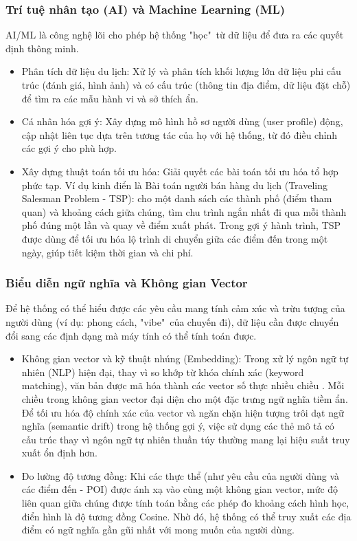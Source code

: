 \subsubsection{Trí tuệ nhân tạo (AI) và Machine Learning (ML)}
AI/ML là công nghệ lõi cho phép hệ thống "học"\ từ dữ liệu để đưa ra các quyết định thông minh.
\begin{itemize}
    \item Phân tích dữ liệu du lịch: Xử lý và phân tích khối lượng lớn dữ liệu phi cấu trúc (đánh giá, hình ảnh) và có cấu trúc (thông tin địa điểm, dữ liệu đặt chỗ) để tìm ra các mẫu hành vi và sở thích ẩn.
    \item Cá nhân hóa gợi ý: Xây dựng mô hình hồ sơ người dùng (user profile) động, cập nhật liên tục dựa trên tương tác của họ với hệ thống, từ đó điều chỉnh các gợi ý cho phù hợp.
    \item Xây dựng thuật toán tối ưu hóa: Giải quyết các bài toán tối ưu hóa tổ hợp phức tạp. Ví dụ kinh điển là Bài toán người bán hàng du lịch (Traveling Salesman Problem - TSP): cho một danh sách các thành phố (điểm tham quan) và khoảng cách giữa chúng, tìm chu trình ngắn nhất đi qua mỗi thành phố đúng một lần và quay về điểm xuất phát. Trong gợi ý hành trình, TSP được dùng để tối ưu hóa lộ trình di chuyển giữa các điểm đến trong một ngày, giúp tiết kiệm thời gian và chi phí.
\end{itemize}

\subsubsection{Biểu diễn ngữ nghĩa và Không gian Vector}
Để hệ thống có thể hiểu được các yêu cầu mang tính cảm xúc và trừu tượng của người dùng (ví dụ: phong cách, "vibe"\ của chuyến đi), dữ liệu cần được chuyển đổi sang các định dạng mà máy tính có thể tính toán được.

\begin{itemize}
    \item Không gian vector và kỹ thuật nhúng (Embedding): Trong xử lý ngôn ngữ tự nhiên (NLP) hiện đại, thay vì so khớp từ khóa chính xác (keyword matching), văn bản được mã hóa thành các vector số thực nhiều chiều \cite{pennington-2014}. Mỗi chiều trong không gian vector đại diện cho một đặc trưng ngữ nghĩa tiềm ẩn. Để tối ưu hóa độ chính xác của vector và ngăn chặn hiện tượng trôi dạt ngữ nghĩa (semantic drift) trong hệ thống gợi ý, việc sử dụng các thẻ mô tả có cấu trúc thay vì ngôn ngữ tự nhiên thuần túy thường mang lại hiệu suất truy xuất ổn định hơn.
    \item Đo lường độ tương đồng: Khi các thực thể (như yêu cầu của người dùng và các điểm đến - POI) được ánh xạ vào cùng một không gian vector, mức độ liên quan giữa chúng được tính toán bằng các phép đo khoảng cách hình học, điển hình là độ tương đồng Cosine. Nhờ đó, hệ thống có thể truy xuất các địa điểm có ngữ nghĩa gần gũi nhất với mong muốn của người dùng.
\end{itemize}

